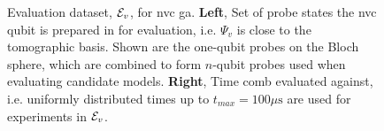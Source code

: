 \begin{figure}
    \begin{center}
        \qquad
    \end{center}
    \caption[Evaluation dataset for nitrogen-vacancy centre genetic algorithm]{
        Evaluation dataset, ${ \mathcal{E} }_v$, for \acrlong{nvc} \acrlong{ga}. 
        \textbf{Left}, Set of \gls{probe} states the \gls{nvc}  qubit is prepared in for evaluation, 
            i.e. $\Psi_v$ is close to the tomographic basis. 
            Shown are the one-qubit \glspl{probe} on the Bloch sphere, which are combined to form 
            $n$-qubit probes used when evaluating candidate models. 
        \textbf{Right}, Time comb evaluated against, i.e. uniformly distributed times up to $t_{max} = 100 \mu \textrm{s}$ 
            are used for \glspl{experiment} in ${ \mathcal{E} }_v$. 
        }
    \label{fig:nv_ga_eval_data}
\end{figure}    

\par 


